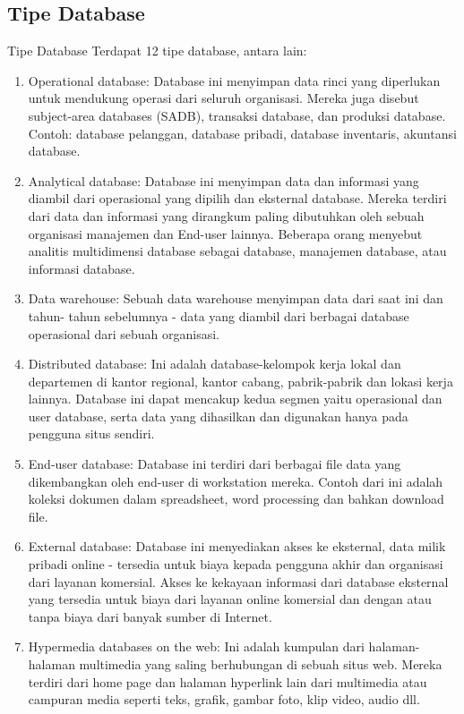 \subsection {Tipe Database} 
	Tipe Database Terdapat 12 tipe database, antara lain: 
	\begin{enumerate}
		\item Operational database: Database ini menyimpan data rinci yang diperlukan untuk mendukung operasi dari seluruh organisasi. Mereka juga disebut subject-area databases (SADB), transaksi database, dan produksi database. Contoh: database pelanggan, database pribadi, database inventaris, akuntansi database.
 
		\item Analytical database: Database ini menyimpan data dan informasi yang diambil dari operasional yang dipilih dan eksternal database. Mereka terdiri dari data dan informasi yang dirangkum paling dibutuhkan oleh sebuah organisasi manajemen dan End-user lainnya. Beberapa orang menyebut analitis multidimensi database sebagai database, manajemen database, atau informasi database.

		\item Data warehouse: Sebuah data warehouse menyimpan data dari saat ini dan tahun- tahun sebelumnya - data yang diambil dari berbagai database operasional dari sebuah organisasi.

		\item Distributed database: Ini adalah database-kelompok kerja lokal dan departemen di kantor regional, kantor cabang, pabrik-pabrik dan lokasi kerja lainnya. Database ini dapat mencakup kedua segmen yaitu operasional dan user database, serta data yang dihasilkan dan digunakan hanya pada pengguna situs sendiri. 
 
		\item End-user database: Database ini terdiri dari berbagai file data yang dikembangkan oleh end-user di workstation mereka. Contoh dari ini adalah koleksi dokumen dalam spreadsheet, word processing dan bahkan download file. 

		\item External database: Database ini menyediakan akses ke eksternal, data milik pribadi online - tersedia untuk biaya kepada pengguna akhir dan organisasi dari layanan komersial. Akses ke kekayaan informasi dari database eksternal yang tersedia untuk biaya dari layanan online komersial dan dengan atau tanpa biaya dari banyak sumber di Internet.

		\item Hypermedia databases on the web: Ini adalah kumpulan dari halaman-halaman multimedia yang saling berhubungan di sebuah situs web. Mereka terdiri dari home page dan halaman hyperlink lain dari multimedia atau campuran media seperti teks, grafik, gambar foto, klip video, audio dll. 


\end{enumerate}
